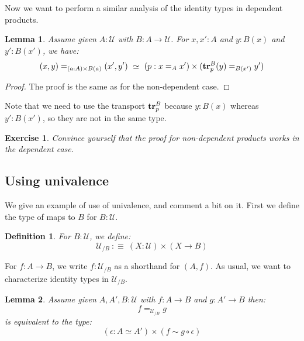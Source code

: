 \documentclass{article}
\newcommand{\sse}[1]{\medbreak \subsection{#1}}
\newcommand{\U}{{\mathcal U}}
\renewcommand{\r}{\rightarrow}
\newcommand{\tr}{\mathrm{\bf tr}}
\newtheorem{lemma}{Lemma}
\newtheorem{definition}{Definition}
\newtheorem{exercise}{Exercise}
\begin{document}

Now we want to perform a similar analysis of the identity types in dependent products.

\begin{lemma}
Assume given $A:\U$ with $B:A\r \U$. For $x,x':A$ and $y:B(x)$ and $y':B(x')$, we have:
\[(x,y)=_{(a:A)\times B(a)} (x',y') \ \simeq \ (p:x=_Ax')\times (\tr^B_p(y) =_{B(x')} y')\]
\end{lemma}
\begin{proof}
The proof is the same as for the non-dependent case.
\end{proof}

Note that we need to use the transport $\tr^B_p$ because $y:B(x)$ whereas $y':B(x')$, so they are not in the same type.

\begin{exercise}
Convince yourself that the proof for non-dependent products works in the dependent case. %
\end{exercise}


\sse{Using univalence}

We give an example of use of univalence, and comment a bit on it. First we define the type of maps to $B$ for $B:\U$.

\begin{definition}
For $B:\U$, we define:
\[\U_{/B}\ :\equiv\ (X:\U)\times (X \r B) \]
\end{definition}

For $f:A\r B$, we write $f:\U_{/B}$ as a shorthand for $(A,f)$. %
As usual, we want to characterize identity types in $\U_{/B}$. %

\begin{lemma}
Assume given $A,A',B:\U$ with $f:A\r B$ and $g:A'\r B$ then:
\[f=_{\U_{/B}} g\]
is equivalent to the type: 
\[(\epsilon:A\simeq A')\times (f \sim g\circ \epsilon)\]
\end{lemma} 
\end{document}
